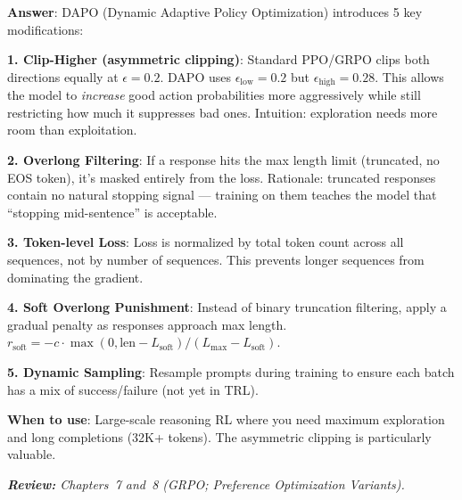 \begin{questionbox}
\textbf{Answer}: DAPO (Dynamic Adaptive Policy Optimization) introduces 5 key modifications:

\textbf{1. Clip-Higher (asymmetric clipping)}: Standard PPO/GRPO clips both directions equally at $\epsilon=0.2$. DAPO uses $\epsilon_\text{low}=0.2$ but $\epsilon_\text{high}=0.28$. This allows the model to \emph{increase} good action probabilities more aggressively while still restricting how much it suppresses bad ones. Intuition: exploration needs more room than exploitation.

\textbf{2. Overlong Filtering}: If a response hits the max length limit (truncated, no EOS token), it’s masked entirely from the loss. Rationale: truncated responses contain no natural stopping signal --- training on them teaches the model that ``stopping mid-sentence'' is acceptable.

\textbf{3. Token-level Loss}: Loss is normalized by total token count across all sequences, not by number of sequences. This prevents longer sequences from dominating the gradient.

\textbf{4. Soft Overlong Punishment}: Instead of binary truncation filtering, apply a gradual penalty as responses approach max length. $r_\text{soft} = -c \cdot \max(0, \text{len} - L_\text{soft})/(L_\text{max} - L_\text{soft})$.

\textbf{5. Dynamic Sampling}: Resample prompts during training to ensure each batch has a mix of success/failure (not yet in TRL).

\textbf{When to use}: Large-scale reasoning RL where you need maximum exploration and long completions (32K+ tokens). The asymmetric clipping is particularly valuable.

\emph{\textbf{Review:} Chapters~7 and~8 (GRPO; Preference Optimization Variants).}
\end{questionbox}

